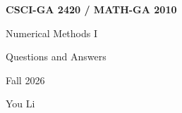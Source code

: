 \documentclass[11pt,oneside]{report}
\begin{document}
\begin{titlepage}
  \raggedright
  \vspace*{2in}
  {\Huge\bfseries CSCI-GA 2420 / MATH-GA 2010\par}
  \vspace{8pt}
  {\LARGE Numerical Methods I\par}
  \vspace{8pt}
  {\LARGE Questions and Answers\par}
  \vspace{8pt}
  {\Large Fall 2026\par}
  \vspace{24pt}
  {\large You Li\par}
\end{titlepage}

\tableofcontents














\end{document}
